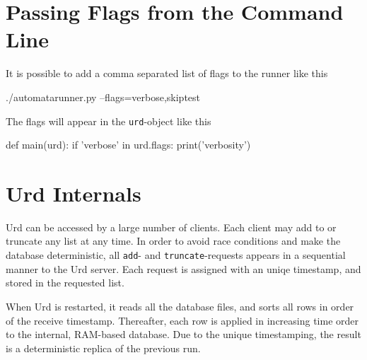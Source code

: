 \section{Passing Flags from the Command Line}
It is possible to add a comma separated list of flags to the runner
like this
\begin{python}
./automatarunner.py --flags=verbose,skiptest
\end{python}
The flags will appear in the \texttt{urd}-object like this
\begin{python}
def main(urd):
    if 'verbose' in urd.flags:
       print('verbosity')
\end{python}


\clearpage
\section{Urd Internals}
Urd can be accessed by a large number of clients.  Each client may add
to or truncate any list at any time.  In order to avoid race
conditions and make the database deterministic, all \texttt{add}-
and \texttt{truncate}-requests appears in a sequential manner to the
Urd server.  Each request is assigned with an uniqe timestamp, and
stored in the requested list.

When Urd is restarted, it reads all the database files, and sorts all
rows in order of the receive timestamp.  Thereafter, each row is
applied in increasing time order to the internal, RAM-based database.
Due to the unique timestamping, the result is a deterministic replica
of the previous run.
